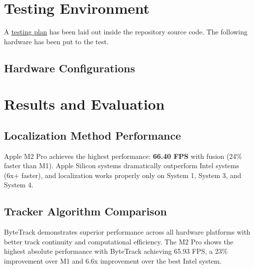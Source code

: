 \documentclass[11pt, a4paper]{article}
\begin{document}
\section{Testing Environment}
A \href{https://github.com/Gioyik/xtrack_sensys_2025/blob/main/TESTING_PLAN.md}{testing plan} has been laid out inside the repository source code. The following hardware has been put to the test.

\subsection{Hardware Configurations}

\begin{table}[h!]
\centering
{}
\caption{Hardware configurations tested for benchmarking.}
\end{table}

\section{Results and Evaluation}
\subsection{Localization Method Performance}
Apple M2 Pro achieves the highest performance: \textbf{66.40 FPS} with fusion (24\% faster than M1). Apple Silicon systems dramatically outperform Intel systems (6x+ faster), and localization works properly only on System 1, System 3, and System 4.

\subsection{Tracker Algorithm Comparison}
ByteTrack demonstrates superior performance across all hardware platforms with better track continuity and computational efficiency. The M2 Pro shows the highest absolute performance with ByteTrack achieving 65.93 FPS, a 23\% improvement over M1 and 6.6x improvement over the best Intel system.
\end{document}
